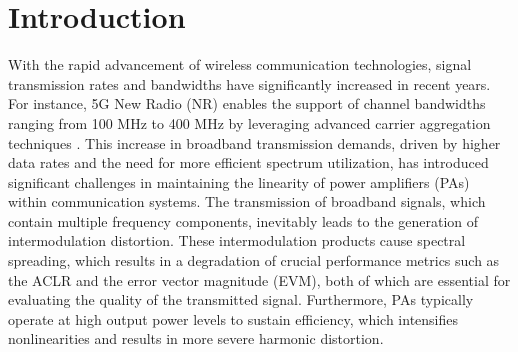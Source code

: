 \documentclass[twoside,twocolumn]{article}
\begin{document}





\inpress	%








\maketitle

\section{Introduction} 
With the rapid advancement of wireless communication technologies, signal transmission rates and bandwidths have significantly increased in recent years. For instance, 5G New Radio (NR) enables the support of channel bandwidths ranging from 100 MHz to 400 MHz by leveraging advanced carrier aggregation techniques \citep{3GPP2,3GPP1}. This increase in broadband transmission demands, driven by higher data rates and the need for more efficient spectrum utilization, has introduced significant challenges in maintaining the linearity of power amplifiers (PAs) within communication systems\citep{5g}. The transmission of broadband signals, which contain multiple frequency components, inevitably leads to the generation of intermodulation distortion. These intermodulation products cause spectral spreading, which results in a degradation of crucial performance metrics such as the ACLR and the error vector magnitude (EVM), both of which are essential for evaluating the quality of the transmitted signal. Furthermore, PAs typically operate at high output power levels to sustain efficiency, which intensifies nonlinearities and results in more severe harmonic distortion.
\end{document}
